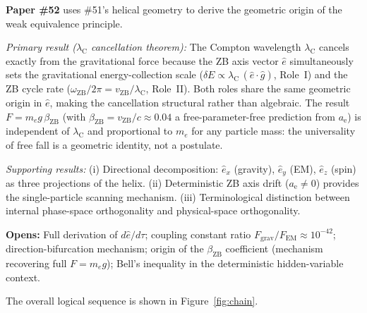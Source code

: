\documentclass[12pt,letterpaper]{article}
\newcommand{\vZB}{v_{\mathrm{ZB}}}
\newcommand{\lambdaC}{\lambda_{\mathrm{C}}}
\newcommand{\anom}{a_{\mathrm{e}}}
\newcommand{\ehat}[1]{\hat{e}_{#1}}
\newcommand{\omZB}{\omega_{\text{ZB}}}
\newcommand{\betaZB}{\beta_{\mathrm{ZB}}}
\begin{document}
\begin{mdframed}[style=orangebox]
\textbf{\textcolor{orange!80!black}{Paper \#52}} uses \#51's helical geometry to derive the geometric origin of the weak equivalence principle.\par\vspace{4pt}
\emph{Primary result ($\lambdaC$ cancellation theorem):} The Compton wavelength $\lambdaC$ cancels exactly from the gravitational force because the ZB axis vector $\hat{e}$ simultaneously sets the gravitational energy-collection scale ($\delta E\propto\lambdaC\,(\hat{e}\cdot\hat{g})$, Role~I) and the ZB cycle rate ($\omZB/2\pi = \vZB/\lambdaC$, Role~II). Both roles share the same geometric origin in $\hat{e}$, making the cancellation structural rather than algebraic. The result $F = m_e g\,\betaZB$ (with $\betaZB = \vZB/c\approx 0.04$ a free-parameter-free prediction from $\anom$) is independent of $\lambdaC$ and proportional to $m_e$ for any particle mass: the universality of free fall is a geometric identity, not a postulate.\par\vspace{4pt}
\emph{Supporting results:} (i) Directional decomposition: $\ehat{x}$ (gravity), $\ehat{y}$ (EM), $\ehat{z}$ (spin) as three projections of the helix. (ii) Deterministic ZB axis drift ($\anom\neq 0$) provides the single-particle scanning mechanism. (iii) Terminological distinction between internal phase-space orthogonality and physical-space orthogonality.\par\vspace{4pt}
\textbf{Opens:} Full derivation of $d\hat{e}/d\tau$; coupling constant ratio $F_{\mathrm{grav}}/F_{\mathrm{EM}}\approx 10^{-42}$; direction-bifurcation mechanism; origin of the $\betaZB$ coefficient (mechanism recovering full $F = m_e g$); Bell's inequality in the deterministic hidden-variable context.
\end{mdframed}

\vspace{0.6cm}

The overall logical sequence is shown in Figure~\ref{fig:chain}.
\end{document}

